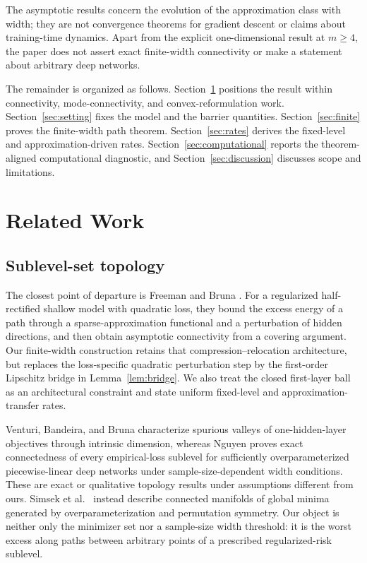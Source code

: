 \documentclass[pdflatex,sn-mathphys-num]{sn-jnl}
\theoremstyle{thmstyleone}
\theoremstyle{thmstyletwo}
\theoremstyle{thmstylethree}
\begin{document}
The asymptotic results concern the evolution of the approximation class with width; they are not convergence theorems for gradient descent or claims about training-time dynamics. Apart from the explicit one-dimensional result at $m\ge4$, the paper does not assert exact finite-width connectivity or make a statement about arbitrary deep networks.

The remainder is organized as follows. Section~\ref{sec:related} positions the result within connectivity, mode-connectivity, and convex-reformulation work. Section~\ref{sec:setting} fixes the model and the barrier quantities. Section~\ref{sec:finite} proves the finite-width path theorem. Section~\ref{sec:rates} derives the fixed-level and approximation-driven rates. Section~\ref{sec:computational} reports the theorem-aligned computational diagnostic, and Section~\ref{sec:discussion} discusses scope and limitations.

\section{Related Work}\label{sec:related}

\subsection{Sublevel-set topology}
The closest point of departure is Freeman and Bruna \cite{FreemanBruna2017}. For a regularized half-rectified shallow model with quadratic loss, they bound the excess energy of a path through a sparse-approximation functional and a perturbation of hidden directions, and then obtain asymptotic connectivity from a covering argument. Our finite-width construction retains that compression--relocation architecture, but replaces the loss-specific quadratic perturbation step by the first-order Lipschitz bridge in Lemma~\ref{lem:bridge}. We also treat the closed first-layer ball as an architectural constraint and state uniform fixed-level and approximation-transfer rates.

Venturi, Bandeira, and Bruna \cite{Venturi2019} characterize spurious valleys of one-hidden-layer objectives through intrinsic dimension, whereas Nguyen \cite{Nguyen2019} proves exact connectedness of every empirical-loss sublevel for sufficiently overparameterized piecewise-linear deep networks under sample-size-dependent width conditions. These are exact or qualitative topology results under assumptions different from ours. Simsek et al.\ \cite{Simsek2021} instead describe connected manifolds of global minima generated by overparameterization and permutation symmetry. Our object is neither only the minimizer set nor a sample-size width threshold: it is the worst excess along paths between arbitrary points of a prescribed regularized-risk sublevel.
\end{document}
